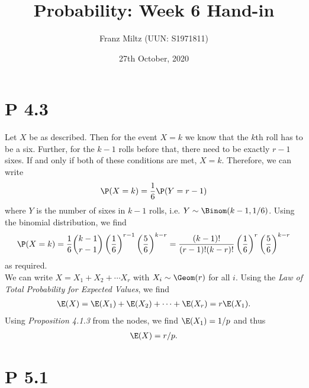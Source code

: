\documentclass{article}
\begin{document}
\title{Probability: Week 6 Hand-in}
\author{Franz Miltz (UUN: S1971811)}
\date{27th October, 2020}
\maketitle


\section*{P 4.3}


Let $X$ be as described. Then for the event $X=k$ we know that
the $k$th roll has to be a six. Further, for the $k-1$ rolls before
that, there need to be exactly $r-1$ sixes. If and only if both of these
conditions are met, $X=k$. Therefore, we can write
\begin{align*}
  \P(X=k) = \frac{1}{6}\P(Y=r-1)
\end{align*}
where $Y$ is the number of sixes in $k-1$ rolls, i.e. $Y\sim\Binom(k-1,1/6)$. Using the binomial
distribution, we find
\begin{align*}
  \P(X=k) = \frac{1}{6}\binom{k-1}{r-1}\left(\frac{1}{6}\right)^ {r-1}
  \left(\frac{5}{6}\right)^{k-r}
  = \frac{(k-1)!}{(r-1)!(k-r)!}\left(\frac{1}{6}\right)^r\left(\frac{5}{6}\right)^{k-r}
\end{align*}
as required. \\
We can write $X=X_1+X_2+\cdots X_r$ with $X_i\sim \Geom(r)$ for all $i$.
Using the \emph{Law of Total Probability for Expected Values}, we find
\begin{align*}
  \E(X) = \E(X_1) + \E(X_2) + \cdots + \E(X_r) = r\E(X_1).
\end{align*}
Using \emph{Proposition 4.1.3} from the nodes, we find $\E(X_1) = 1/p$ and thus
\begin{align*}
  \E(X) = r/p.
\end{align*}


\section*{P 5.1}
\end{document}
